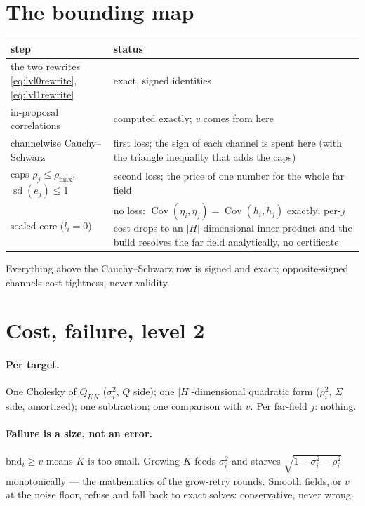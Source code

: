 \documentclass[11pt]{article}
\theoremstyle{remark}
\newcommand{\Cov}{\operatorname{Cov}}
\newcommand{\sd}{\operatorname{sd}}
\begin{document}
\section{The bounding map}\label{sec:map}

\begin{center}
\begin{tabular}{>{\raggedright}p{}>{\raggedright\arraybackslash}p{}}
\toprule
\textbf{step} & \textbf{status} \\
\midrule
the two rewrites
\eqref{eq:lvl0rewrite},\,\eqref{eq:lvl1rewrite} & exact, signed
identities \\
in-proposal correlations & computed exactly; $v$ comes from here \\
channelwise Cauchy--Schwarz & first loss; the sign of each channel is
spent here (with the triangle inequality that adds the caps) \\
caps $\rho_j \le \rho_{\max}$, $\sd(e_j) \le 1$ & second loss; the
price of one number for the whole far field \\
sealed core ($l_i = 0$) & no loss: $\Cov(\eta_i,\eta_j) =
\Cov(h_i,h_j)$ exactly; per-$j$ cost drops to an $|H|$-dimensional
inner product and the build resolves the far field analytically, no
certificate \\
\bottomrule
\end{tabular}
\end{center}

\medskip

Everything above the Cauchy--Schwarz row is signed and exact;
opposite-signed channels cost tightness, never validity.

\section{Cost, failure, level 2}\label{sec:cost}

\paragraph{Per target.}  One Cholesky of $Q_{KK}$ ($\sigma_i^2$, $Q$
side); one $|H|$-dimensional quadratic form ($\rho_i^2$, $\Sigma$ side,
amortized); one subtraction; one comparison with $v$.  Per far-field
$j$: nothing.

\paragraph{Failure is a size, not an error.}
$\mathrm{bnd}_i \ge v$ means $K$ is too small.  Growing $K$ feeds
$\sigma_i^2$ and starves $\sqrt{1-\sigma_i^2-\rho_i^2}$ monotonically
--- the mathematics of the grow-retry rounds.  Smooth fields, or $v$ at
the noise floor, refuse and fall back to exact solves: conservative,
never wrong.
\end{document}
